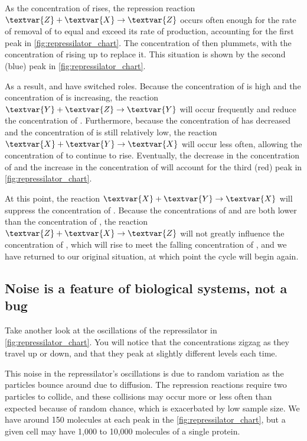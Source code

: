 As the concentration of  rises, the repression reaction $\textvar{Z} + \textvar{X} \rightarrow \textvar{Z}$ occurs often enough for the rate of removal of  to equal and exceed its rate of production, accounting for the first peak in \autoref{fig:repressilator_chart}. The concentration of  then plummets, with the concentration of  rising up to replace it. This situation is shown by the second (blue) peak in \autoref{fig:repressilator_chart}.

As a result,  and  have switched roles. Because the concentration of  is high and the concentration of  is increasing, the reaction $\textvar{Y} + \textvar{Z} \rightarrow \textvar{Y}$ will occur frequently and reduce the concentration of . Furthermore, because the concentration of  has decreased and the concentration of  is still relatively low, the reaction $\textvar{X} + \textvar{Y} \rightarrow \textvar{X}$ will occur less often, allowing the concentration of  to continue to rise. Eventually, the decrease in the concentration of  and the increase in the concentration of  will account for the third (red) peak in \autoref{fig:repressilator_chart}.

At this point, the reaction $\textvar{X} + \textvar{Y} \rightarrow \textvar{X}$ will suppress the concentration of . Because the concentrations of  and  are both lower than the concentration of , the reaction $\textvar{Z} + \textvar{X} \rightarrow \textvar{Z}$ will not greatly influence the concentration of , which will rise to meet the falling concentration of , and we have returned to our original situation, at which point the cycle will begin again.

\FloatBarrier
{}
\subsection{Noise is a feature of biological systems, not a bug}

Take another look at the oscillations of the repressilator in \autoref{fig:repressilator_chart}. You will notice that the concentrations zigzag as they travel up or down, and that they peak at slightly different levels each time.

This noise in the repressilator's oscillations is due to random variation as the particles bounce around due to diffusion. The repression reactions require two particles to collide, and these collisions may occur more or less often than expected because of random chance, which is exacerbated by low sample size. We have around 150 molecules at each peak in the \autoref{fig:repressilator_chart}, but a given cell may have 1,000 to 10,000 molecules of a single protein.


